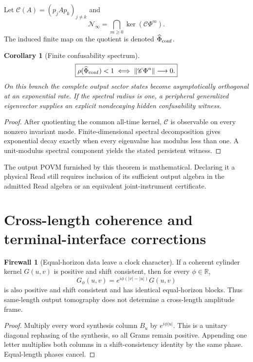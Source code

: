\documentclass[11pt,oneside,openany]{book}
\numberwithin{equation}{chapter}
\newtheorem{corollary}[theorem]{Corollary}
\theoremstyle{definition}
\newtheorem{firewall}[theorem]{Firewall}
\theoremstyle{remark}
\newcommand{\R}{\mathbb R}
\newcommand{\norm}[1]{\lVert #1\rVert}
\begin{document}
Let \(\mathscr C(A)=(p_jAp_k)_{j\ne k}\) and
\[
 \mathcal N_\infty=\bigcap_{m\ge0}\ker(\mathscr C\Phi^m).
\]
The induced finite map on the quotient is denoted
\(\widehat\Phi_{\rm conf}\).

\begin{corollary}[Finite confusability spectrum]
\label{cor:v6-confusability-spectrum}
\[
 \boxed{
 \rho(\widehat\Phi_{\rm conf})<1
 \iff
 \norm{\mathscr C\Phi^n}\longrightarrow0.}
\]
On this branch the complete output sector states become asymptotically
orthogonal at an exponential rate.  If the spectral radius is one, a
peripheral generalized eigenvector supplies an explicit nondecaying hidden
confusability witness.
\end{corollary}

\begin{proof}
After quotienting the common all-time kernel, \(\mathscr C\) is observable on
every nonzero invariant mode.  Finite-dimensional spectral decomposition gives
exponential decay exactly when every eigenvalue has modulus less than one.  A
unit-modulus spectral component yields the stated persistent witness.
\end{proof}

The output POVM furnished by this theorem is mathematical.  Declaring it a
physical Read still requires inclusion of its sufficient output algebra in the
admitted Read algebra or an equivalent joint-instrument certificate.

\section{Cross-length coherence and terminal-interface corrections}

\begin{firewall}[Equal-horizon data leave a clock character]
\label{fw:v6-clock-character}
If a coherent cylinder kernel \(G(u,v)\) is positive and shift consistent, then
for every \(\phi\in\R\),
\[
 \boxed{
 G_\phi(u,v)=e^{i\phi(|v|-|u|)}G(u,v)}
\]
is also positive and shift consistent and has identical equal-horizon blocks.
Thus same-length output tomography does not determine a cross-length amplitude
frame.
\end{firewall}

\begin{proof}
Multiply every word synthesis column \(B_u\) by
\(e^{i\phi|u|}\).  This is a unitary diagonal rephasing of the synthesis, so
all Grams remain positive.  Appending one letter multiplies both columns in a
shift-consistency identity by the same phase.  Equal-length phases cancel.
\end{proof}
\end{document}
